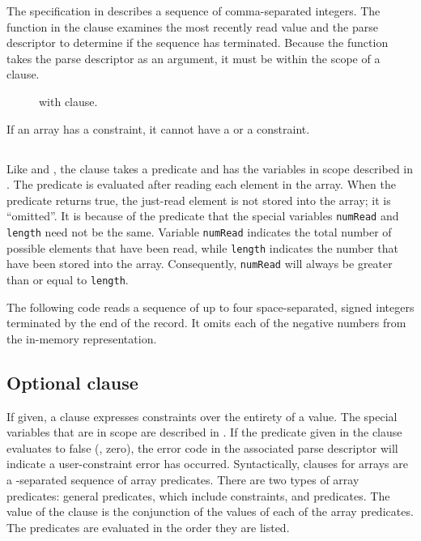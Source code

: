 The specification in  describes a sequence of
comma-separated 
integers.  The  function in the \Pended{} clause examines
the most recently read value and the parse descriptor to determine if
the sequence has terminated.  Because the function takes the parse
descriptor as an argument, it must be within the scope of a
\Pparsecheck{} clause.

\begin{figure}
\caption{\Parray{} with \Pomit{} clause.}
\label{fig:array-ended}
\end{figure}

If an array has a \Pended{} constraint, it cannot have a
\Plast{} or a \Plongest{} constraint.

\subsection{\Pomit}
Like \Plast{} and \Pended{}, the \Pomit{} clause takes a predicate and
has the variables in scope described in
. 
The predicate is evaluated after reading each element in the array.
When the predicate returns true, the just-read element is not stored
into the array;  it is ``omitted''.  It is because of the \Pomit{}
predicate that the special variables \texttt{numRead} and
\texttt{length} need not be the same.  Variable \texttt{numRead}
indicates the total number of possible elements that have been read,
while \texttt{length} indicates the number that have been stored into
the array.  Consequently, \texttt{numRead} will always be greater than
or equal to \texttt{length}.  


The following code reads a sequence of up to four
space-separated, signed 
integers terminated by the end of the record.  It omits each of the
negative numbers from the in-memory representation.


\subsection{Optional \Pwhere{} clause}
If given, a \Pwhere{} clause expresses constraints over the entirety
of a \Parray{} value. The special variables that are in scope are
described in .
If the predicate given in
the \Pwhere{} clause evaluates to false (\ie{}, zero), the error code
in the associated parse descriptor will indicate a user-constraint
error has occurred.   Syntactically,  \Pwhere{} clauses for arrays are
a \cd{\&\&}-separated sequence of array predicates.   There are two types of
array predicates: general predicates, which include \Pparsecheck{}
constraints, and  
\Pforall{} predicates.  The value of the \Pwhere{} clause is the
conjunction of the values of each of the array predicates.  The
predicates are evaluated in the order they are listed.

